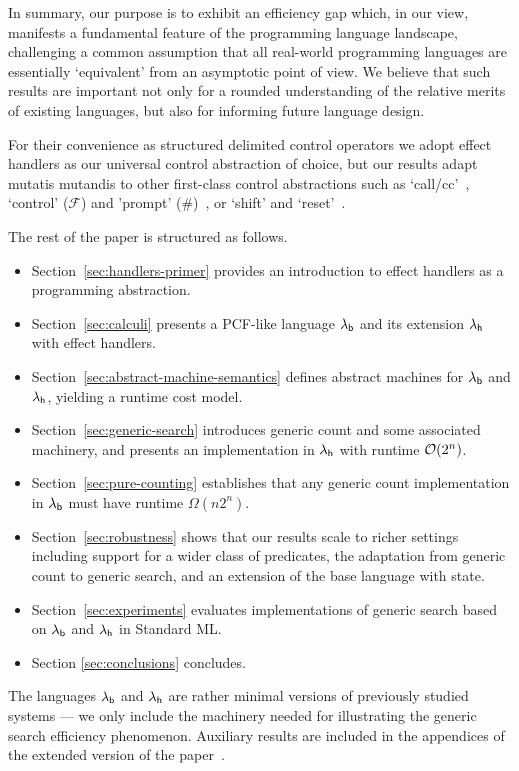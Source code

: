 \documentclass[12pt,phd,lfcs,twoside,openright,logo,leftchapter,normalheadings]{infthesis}
\theoremstyle{plain}
\theoremstyle{definition}
\begin{document}
In summary, our purpose is to exhibit an efficiency gap which, in our
view, manifests a fundamental feature of the programming language
landscape, challenging a common assumption that all real-world
programming languages are essentially `equivalent' from an asymptotic
point of view.  We believe that such results are important not only
for a rounded understanding of the relative merits of existing
languages, but also for informing future language design.

For their convenience as structured delimited control operators we
adopt effect handlers as our universal control abstraction of choice,
but our results adapt mutatis mutandis to other first-class control
abstractions such as `call/cc'~\cite{AbelsonHAKBOBPCRFRHSHW85}, `control'
($\mathcal{F}$) and 'prompt' ($\textbf{\#}$)~\citep{Felleisen88}, or
`shift' and `reset'~\citep{DanvyF90}.

The rest of the paper is structured as follows.
\begin{itemize}
 \item Section~\ref{sec:handlers-primer} provides an introduction to
   effect handlers as a programming abstraction.
 \item Section~\ref{sec:calculi} presents a PCF-like language
   $\lambda_{\mathsf{b}}$ and its extension $\lambda_{\mathsf{h}}$ with effect handlers.
 \item Section~\ref{sec:abstract-machine-semantics} defines abstract
   machines for $\lambda_{\mathsf{b}}$ and $\lambda_{\mathsf{h}}$, yielding a runtime cost model.
 \item Section~\ref{sec:generic-search} introduces generic count and
   some associated machinery, and presents an implementation in
   $\lambda_{\mathsf{h}}$ with runtime $\mathcal{O}(2^n)$.
 \item Section~\ref{sec:pure-counting} establishes that any generic
   count implementation in $\lambda_{\mathsf{b}}$ must have runtime $\Omega(n2^n)$.
 \item Section~\ref{sec:robustness} shows that our results scale to
   richer settings including support for a wider class of predicates,
   the adaptation from generic count to generic search, and an
   extension of the base language with state.
 \item Section~\ref{sec:experiments} evaluates implementations of
   generic search based on $\lambda_{\mathsf{b}}$ and $\lambda_{\mathsf{h}}$ in Standard ML.
 \item Section \ref{sec:conclusions} concludes.
\end{itemize}
%
The languages $\lambda_{\mathsf{b}}$ and $\lambda_{\mathsf{h}}$ are rather minimal versions of
previously studied systems --- we only include the machinery needed
for illustrating the generic search efficiency phenomenon.
%
Auxiliary results are included in the appendices of the extended
version of the paper~\citep{HillerstromLL20}.
\end{document}

